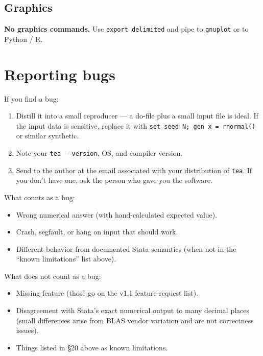 \documentclass[11pt,letterpaper]{article}
\begin{document}
\subsection{Graphics}

\textbf{No graphics commands.}  Use \texttt{export delimited} and pipe
to \texttt{gnuplot} or to Python / R.

\section{Reporting bugs}

If you find a bug:

\begin{enumerate}
\item Distill it into a small reproducer — a do-file plus a small input
file is ideal.  If the input data is sensitive, replace it with
\texttt{set seed N; gen x = rnormal()} or similar synthetic.
\item Note your \verb|tea --version|, OS, and compiler version.
\item Send to the author at the email associated with your distribution
of \texttt{tea}.  If you don't have one, ask the person who gave you the
software.
\end{enumerate}

What counts as a bug:

\begin{itemize}
\item Wrong numerical answer (with hand-calculated expected value).
\item Crash, segfault, or hang on input that should work.
\item Different behavior from documented Stata semantics (when not in
the ``known limitations'' list above).
\end{itemize}

What does not count as a bug:

\begin{itemize}
\item Missing feature (those go on the v1.1 feature-request list).
\item Disagreement with Stata's exact numerical output to many decimal
places (small differences arise from BLAS vendor variation and are not
correctness issues).
\item Things listed in \S20 above as known limitations.
\end{itemize}

\appendix
\end{document}
